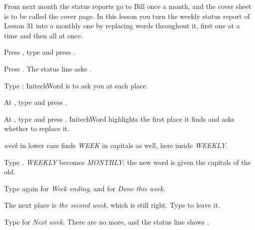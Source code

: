 From next month the status reports go to Bill once a month, and the cover
sheet is to be called the cover page.  In this lesson you turn the weekly
status report of Lesson 31 into a monthly one by replacing words throughout
it, first one at a time and then all at once.

\begin{WPSteps}
\item Press , type  and press
.
\item Press .  The status line asks
.
\item Type : InitechWord is to ask you at each place.
\item At , type  and press .
\item At , type  and press
.  InitechWord highlights the first place it finds and asks
whether to replace it.
\end{WPSteps}
\begin{Aside}\textit{week} in lower case finds \textit{WEEK} in capitals as
well, here inside \textit{WEEKLY}.\end{Aside}
\begin{WPSteps}[resume]
\item Type .  \textit{WEEKLY} becomes \textit{MONTHLY}: the new
word is given the capitals of the old.
\item Type  again for \textit{Week ending}, and
 for \textit{Done this week}.
\item The next place is \textit{the second week}, which is still right.
Type  to leave it.
\item Type  for \textit{Next week}.  There are no more, and the
status line shows .
\end{WPSteps}

